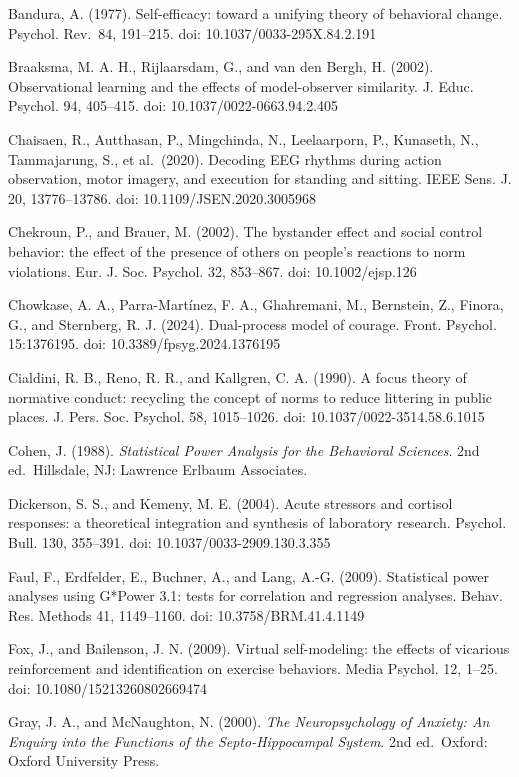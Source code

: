 \documentclass[
]{article}
\begin{document}
Bandura, A. (1977). Self-efficacy: toward a unifying theory of
behavioral change. Psychol. Rev.~84, 191--215. doi:
10.1037/0033-295X.84.2.191

Braaksma, M. A. H., Rijlaarsdam, G., and van den Bergh, H. (2002).
Observational learning and the effects of model-observer similarity. J.
Educ. Psychol. 94, 405--415. doi: 10.1037/0022-0663.94.2.405

Chaisaen, R., Autthasan, P., Mingchinda, N., Leelaarporn, P., Kunaseth,
N., Tammajarung, S., et al.~(2020). Decoding EEG rhythms during action
observation, motor imagery, and execution for standing and sitting. IEEE
Sens. J. 20, 13776--13786. doi: 10.1109/JSEN.2020.3005968

Chekroun, P., and Brauer, M. (2002). The bystander effect and social
control behavior: the effect of the presence of others on people's
reactions to norm violations. Eur. J. Soc. Psychol. 32, 853--867. doi:
10.1002/ejsp.126

Chowkase, A. A., Parra-Martínez, F. A., Ghahremani, M., Bernstein, Z.,
Finora, G., and Sternberg, R. J. (2024). Dual-process model of courage.
Front. Psychol. 15:1376195. doi: 10.3389/fpsyg.2024.1376195

Cialdini, R. B., Reno, R. R., and Kallgren, C. A. (1990). A focus theory
of normative conduct: recycling the concept of norms to reduce littering
in public places. J. Pers. Soc. Psychol. 58, 1015--1026. doi:
10.1037/0022-3514.58.6.1015

Cohen, J. (1988). \emph{Statistical Power Analysis for the Behavioral
Sciences}. 2nd ed.~Hillsdale, NJ: Lawrence Erlbaum Associates.

Dickerson, S. S., and Kemeny, M. E. (2004). Acute stressors and cortisol
responses: a theoretical integration and synthesis of laboratory
research. Psychol. Bull. 130, 355--391. doi: 10.1037/0033-2909.130.3.355

Faul, F., Erdfelder, E., Buchner, A., and Lang, A.-G. (2009).
Statistical power analyses using G*Power 3.1: tests for correlation and
regression analyses. Behav. Res. Methods 41, 1149--1160. doi:
10.3758/BRM.41.4.1149

Fox, J., and Bailenson, J. N. (2009). Virtual self-modeling: the effects
of vicarious reinforcement and identification on exercise behaviors.
Media Psychol. 12, 1--25. doi: 10.1080/15213260802669474

Gray, J. A., and McNaughton, N. (2000). \emph{The Neuropsychology of
Anxiety: An Enquiry into the Functions of the Septo-Hippocampal System}.
2nd ed.~Oxford: Oxford University Press.
\end{document}
